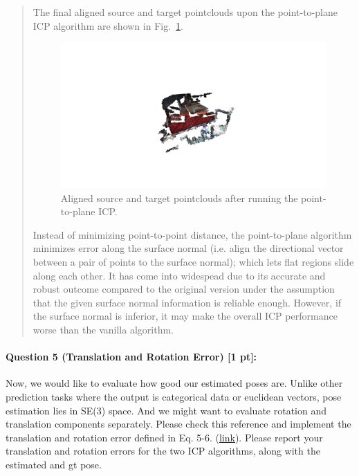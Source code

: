 \documentclass[11pt]{article}
\begin{document}
\begin{quote}
The final aligned source and target pointclouds upon the point-to-plane ICP algorithm are shown in Fig.~\ref{fig:pcds_icp_point2plane}.
\begin{figure}[h]
    \centering
    \includegraphics[width=1.0\linewidth]{pcds_icp_point2plane.jpg}
    \caption{Aligned source and target pointclouds after running the point-to-plane ICP.}
    \label{fig:pcds_icp_point2plane}
\end{figure}

\color{red}


Instead of minimizing point-to-point distance, the point-to-plane algorithm minimizes error along the surface normal (i.e. align the directional vector between a pair of points to the surface normal); which lets flat regions slide along each other. It has come into widespead due to its accurate and robust outcome compared to the original version under the assumption that the given surface normal information is reliable enough. However, if the surface normal is inferior, it may make the overall ICP performance worse than the vanilla algorithm.

\end{quote}


\paragraph{Question 5 (Translation and Rotation Error) [1 pt]:} Now, we would like to evaluate how good our estimated poses are. Unlike other prediction tasks where the output is categorical data or euclidean vectors, pose estimation lies in SE(3) space. And we might want to evaluate rotation and translation components separately. Please check this reference and implement the translation and rotation error defined in Eq. 5-6. (\href{https://cmp.felk.cvut.cz/~hodanto2/data/hodan2016evaluation.pdf}{link}). Please report your translation and rotation errors for the two ICP algorithms, along with the estimated and gt pose.  
\end{document}
